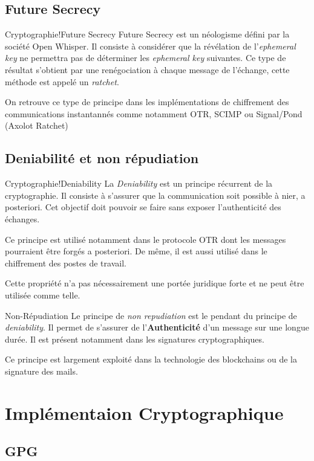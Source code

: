\subsection{Future Secrecy}
\begin{Define}{Cryptographie!Future Secrecy}
	Future Secrecy est un néologisme défini par la société Open Whisper. Il consiste à considérer que la révélation de l'\textit{ephemeral key} ne permettra pas de déterminer les \textit{ephemeral key} suivantes. Ce type de résultat s'obtient par une renégociation à chaque message de l'échange, cette méthode est appelé un \textit{ratchet}.
\end{Define}
On retrouve ce type de principe dans les implémentations de chiffrement des communications instantannés comme notamment \gls{OTR}, \gls{SCIMP} ou Signal/Pond (Axolot Ratchet)
\subsection{Deniabilité et non répudiation}
\begin{Define}{Cryptographie!Deniability}
La \textit{Deniability} est un principe récurrent de la cryptographie. Il consiste à s'assurer que la communication soit possible à nier, a posteriori. Cet objectif doit pouvoir se faire sans exposer l'authenticité des échanges.
\end{Define}
Ce principe est utilisé notamment dans le protocole OTR dont les messages pourraient être forgés a posteriori. De même, il est aussi utilisé dans le chiffrement des postes de travail.
\begin{Stop}
Cette propriété n'a pas nécessairement une portée juridique forte et ne peut être utilisée comme telle.
\end{Stop}
\begin{Define}{Non-Répudiation}
Le principe de \textit{non repudiation} est le pendant du principe de \textit{deniability}. Il permet de s'assurer de l'\textbf{Authenticité} d'un message sur une longue durée. Il est présent notamment dans les signatures cryptographiques.
\end{Define}
Ce principe est largement exploité dans la technologie des blockchains ou de la signature des mails. 
\section{Implémentaion Cryptographique}
\subsection{GPG}
